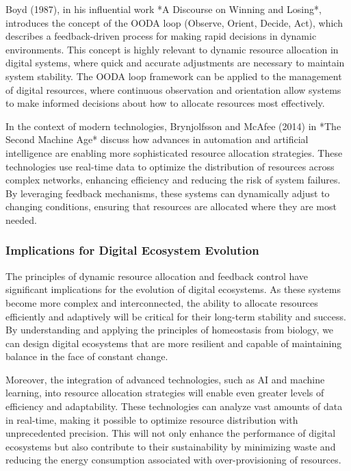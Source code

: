 \documentclass[12pt,twoside]{article}
\begin{document}
Boyd (1987), in his influential work *A Discourse on Winning and Losing*, introduces the concept of the OODA loop (Observe, Orient, Decide, Act), which describes a feedback-driven process for making rapid decisions in dynamic environments. This concept is highly relevant to dynamic resource allocation in digital systems, where quick and accurate adjustments are necessary to maintain system stability. The OODA loop framework can be applied to the management of digital resources, where continuous observation and orientation allow systems to make informed decisions about how to allocate resources most effectively.

In the context of modern technologies, Brynjolfsson and McAfee (2014) in *The Second Machine Age* discuss how advances in automation and artificial intelligence are enabling more sophisticated resource allocation strategies. These technologies use real-time data to optimize the distribution of resources across complex networks, enhancing efficiency and reducing the risk of system failures. By leveraging feedback mechanisms, these systems can dynamically adjust to changing conditions, ensuring that resources are allocated where they are most needed.

\subsubsection{Implications for Digital Ecosystem Evolution}

The principles of dynamic resource allocation and feedback control have significant implications for the evolution of digital ecosystems. As these systems become more complex and interconnected, the ability to allocate resources efficiently and adaptively will be critical for their long-term stability and success. By understanding and applying the principles of homeostasis from biology, we can design digital ecosystems that are more resilient and capable of maintaining balance in the face of constant change.

Moreover, the integration of advanced technologies, such as AI and machine learning, into resource allocation strategies will enable even greater levels of efficiency and adaptability. These technologies can analyze vast amounts of data in real-time, making it possible to optimize resource distribution with unprecedented precision. This will not only enhance the performance of digital ecosystems but also contribute to their sustainability by minimizing waste and reducing the energy consumption associated with over-provisioning of resources.
\end{document}
